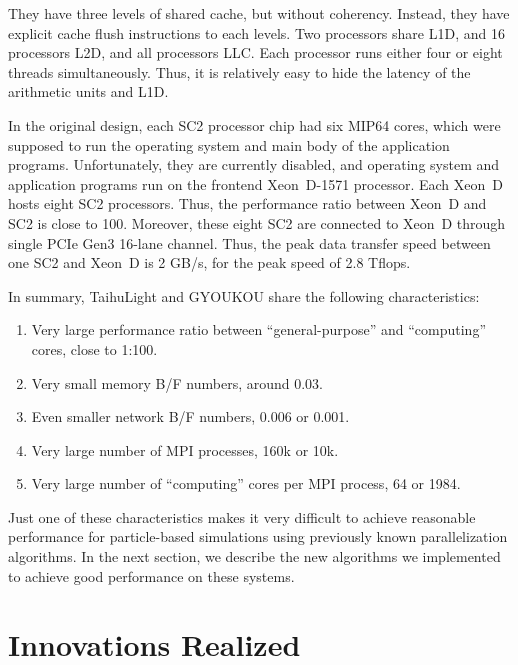 \documentclass[conference]{IEEEtran}
\begin{document}
They have three levels of shared cache, but without
coherency. Instead, they have explicit cache flush instructions to each
levels. Two processors share L1D, and 16 processors L2D, and all
processors LLC. Each processor runs either four or eight threads
simultaneously. Thus, it is relatively easy to hide the  latency of
the arithmetic units and L1D.

In the original design, each SC2 processor chip had six MIP64 cores,
which were supposed to run the operating system and main body of the
application programs. Unfortunately, they are currently disabled, and
operating system and application programs run on the frontend  Xeon~D-1571
processor. Each Xeon~D hosts eight SC2 processors. Thus, the
performance ratio between Xeon~D and SC2 is close to 100.
Moreover, these eight SC2 are connected to Xeon~D through single PCIe
Gen3 16-lane channel. Thus, the peak data transfer speed between one
SC2 and Xeon~D is 2 GB/s, for the peak speed of 2.8 Tflops.


%
In summary, TaihuLight and GYOUKOU share the following
characteristics:

\begin{enumerate}



\item Very large performance ratio between ``general-purpose''
  and ``computing'' cores, close to 1:100.
\item  Very small memory  B/F numbers, around 0.03.
\item  Even smaller network B/F numbers, 0.006 or 0.001.
\item Very large number of MPI processes, 160k  or 10k.
\item Very large number of ``computing'' cores per MPI process, 64 or 1984.  
\end{enumerate}

Just one of these characteristics makes it very difficult to achieve
reasonable performance for particle-based simulations using previously
known parallelization algorithms. In the next section, we describe the
new algorithms we implemented to achieve good performance on these systems.



\section{Innovations Realized}
\label{sect:innovation}
\end{document}
